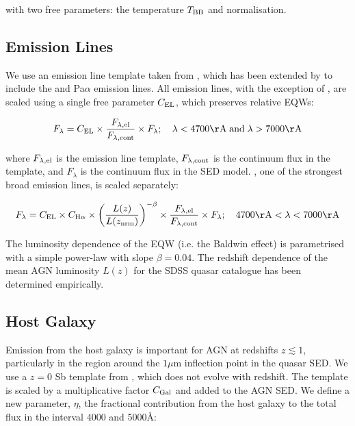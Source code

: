 with two free parameters: the temperature $T_{\rm BB}$ and normalisation. 

\subsection{Emission Lines}

We use an emission line template taken from \citet{francis91}, which has been extended by \citet{maddox06} to include the \hans and Pa$\alpha$ emission lines. 
All emission lines, with the exception of \hans, are scaled using a single free parameter $C_{\rm EL}$, which preserves relative \ac{EQW}s:

\begin{eqnarray}
  F_{\lambda} =  C_{\rm EL} \times \frac{F_{\lambda, \rm el}}{F_{\lambda, \rm cont}} \times F_{\lambda} ; \quad \lambda < 4700{\rm \AA} \;{\rm and}\; \lambda > 7000{\rm \AA} 
\end{eqnarray} 

where $F_{\lambda, \rm el}$ is the emission line template, $F_{\lambda,\rm cont}$ is the continuum flux in the template, and $F_{\lambda}$ is the continuum flux in the \ac{SED} model.  
\hans, one of the strongest broad emission lines, is scaled separately: 

\begin{equation}
  F_{\lambda} =  C_{\rm EL} \times C_{{\rm H} \alpha} \times \left( \frac{L(z)} {L(z_{\rm nrm})} \right)^{-\beta} \times \frac{F_{\lambda, \rm el}}{F_{\lambda, \rm cont}} \times F_{\lambda}; \quad 4700{\rm \AA} < \lambda < 7000{\rm \AA} 
\end{equation}

The luminosity dependence of the \ha EQW (i.e. the Baldwin effect) is parametrised with a simple power-law with slope $\beta=0.04$.
The redshift dependence of the mean \ac{AGN} luminosity $L(z)$ for the SDSS quasar catalogue has been determined empirically.

\subsection{Host Galaxy}

Emission from the host galaxy is important for \ac{AGN} at redshifts $z\lesssim1$, particularly in the region around the $1\mu$m inflection point in the quasar \ac{SED}. 
We use a $z=0$ Sb template from \citet{mannucci01}, which does not evolve with redshift.
The template is scaled by a multiplicative factor $C_{\rm Gal}$ and added to the \ac{AGN} \ac{SED}. 
We define a new parameter, $\eta$, the fractional contribution from the host galaxy to the total flux in the interval 4000 and 5000\AA:

